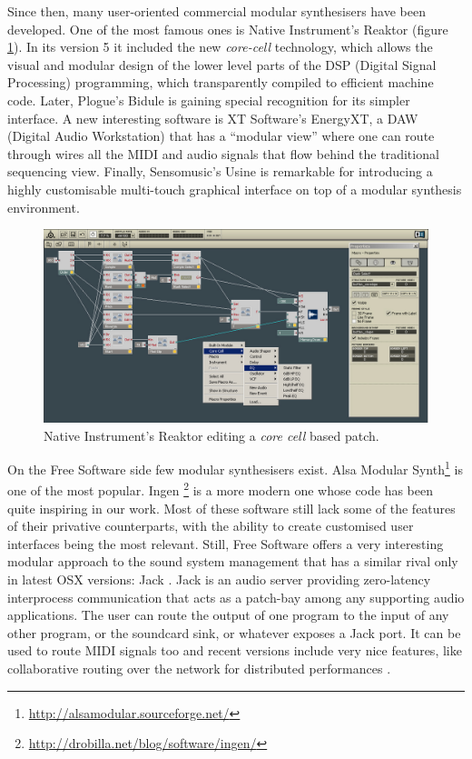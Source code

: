 Since then, many user-oriented commercial modular synthesisers have
been developed. One of the most famous ones is Native Instrument's
Reaktor (figure \ref{fig:reaktor}). In its version 5 it
included the new \emph{core-cell} technology, which allows the visual
and modular design of the lower level parts of the DSP (Digital Signal
Processing) programming, which
transparently compiled to efficient machine code. Later, Plogue's
Bidule is gaining special recognition for its simpler
interface. A new interesting software is XT Software's EnergyXT, a DAW
(Digital Audio Workstation) that
has a ``modular view'' where one can route through wires all the MIDI
and audio signals that flow behind the traditional sequencing
view. Finally, Sensomusic's Usine is remarkable for
introducing a highly customisable multi-touch graphical interface on
top of a modular synthesis environment.

\begin{figure}[h!]
\centering
\includegraphics[width=.9\textwidth]{pic/reaktor.jpg}
\caption{Native Instrument's Reaktor editing a \emph{core cell} based
  patch.}
\label{fig:reaktor}
\end{figure}

On the Free Software side few modular
synthesisers exist. Alsa Modular Synth\footnote{\url{http://alsamodular.sourceforge.net/}} is one of
the most popular. Ingen
\footnote{\url{http://drobilla.net/blog/software/ingen/}} is a more
modern one whose code has been quite inspiring in our work. Most of
these software still lack some of the features of their privative
counterparts, with the ability to create customised user interfaces
being the most relevant. Still, Free Software offers a very
interesting modular approach to the sound system management that has a
similar rival only in latest OSX versions: Jack
\cite{letz09jack2}. Jack is an audio server providing zero-latency
interprocess communication that acts as a patch-bay among any
supporting audio applications. The user can route the output of one
program to the input of any other program, or the soundcard sink, or
whatever exposes a Jack port. It can be used to route MIDI signals too
and recent versions include very nice features, like collaborative
routing over the network for distributed performances
\cite{hohn09netjack}.


